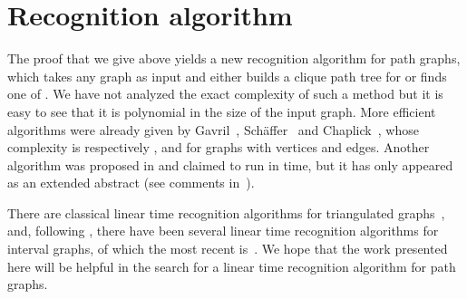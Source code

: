 \documentclass[11pt]{article}
\begin{document}
\section{Recognition algorithm}

The proof that we give above yields a new recognition algorithm for
path graphs, which takes any graph  as input and either builds a
clique path tree for  or finds one of .  We
have not analyzed the exact complexity of such a method but it is easy
to see that it is polynomial in the size of the input graph.  More
efficient algorithms were already given by Gavril~\cite{Gav78},
Sch\"affer~\cite{Sch93} and Chaplick~\cite{Cha08}, whose complexity is
respectively ,  and  for graphs with 
vertices and  edges.  Another algorithm was proposed in
\cite{DahBai96} and claimed to run in  time, but it has only
appeared as an extended abstract (see comments in~\cite[Section
2.1.4]{Cha08}).

There are classical linear time recognition algorithms for
triangulated graphs~\cite{RTL76}, and, following \cite{BL76}, there
have been several linear time recognition algorithms for interval
graphs, of which the most recent is~\cite{HMPV}.  We hope that the
work presented here will be helpful in the search for a linear time
recognition algorithm for path graphs.
\end{document}
